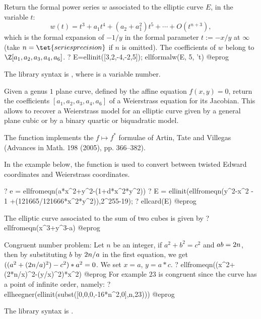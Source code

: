 \label{se:ellformalw}
Return the formal power series $w$ associated to the elliptic curve $E$,
in the variable $t$:
$$ w(t) = t^3 + a_1 t^4 + (a_2 + a_1^2) t^5 + \cdots + O(t^{n+3}),$$
which is the formal expansion of $-1/y$ in the formal parameter $t := -x/y$
at $\infty$ (take $n = \tet{seriesprecision}$ if $n$ is omitted). The
coefficients of $w$ belong to $\Z[a_1,a_2,a_3,a_4,a_6]$.
\bprog
? E=ellinit([3,2,-4,-2,5]); ellformalw(E, 5, 't)
@eprog

The library syntax is , where  is a variable number.

\label{se:ellfromeqn}
Given a genus $1$ plane curve, defined by the affine equation $f(x,y) = 0$,
return the coefficients $[a_1,a_2,a_3,a_4,a_6]$ of a Weierstrass equation
for its Jacobian. This allows to recover a Weierstrass model for an elliptic
curve given by a general plane cubic or by a binary quartic or biquadratic
model.

The function implements the $f \mapsto f^*$ formulae of Artin, Tate and
Villegas (Advances in Math. 198 (2005), pp. 366--382).

In the example below, the function is used to convert between twisted Edward
coordinates and Weierstrass coordinates.

\bprog
? e = ellfromeqn(a*x^2+y^2-(1+d*x^2*y^2))
? E = ellinit(ellfromeqn(y^2-x^2 - 1 +(121665/121666*x^2*y^2)),2^255-19);
? ellcard(E)
@eprog

The elliptic curve associated to the sum of two cubes is given by
\bprog
? ellfromeqn(x^3+y^3-a)
@eprog

Congruent number problem: Let $n$ be an integer,
if $a^2+b^2=c^2$ and $a\*b=2\*n$,
then by substituting $b$ by $2\*n/a$ in the first equation,
we get $((a^2+(2\*n/a)^2)-c^2)*a^2 = 0$.
We set $x=a$, $y=a*c$.
\bprog
? ellfromeqn((x^2+(2*n/x)^2-(y/x)^2)*x^2)
@eprog
For example $23$ is congruent since the curve has a point of infinite order,
namely:
\bprog
? ellheegner(ellinit(subst([0,0,0,-16*n^2,0],n,23)))
@eprog

The library syntax is .

